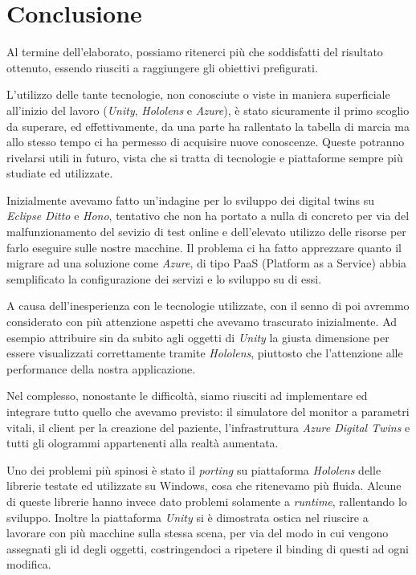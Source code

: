 \chapter{Conclusione}

Al termine dell'elaborato, possiamo ritenerci più che soddisfatti del risultato ottenuto, essendo riusciti a raggiungere gli obiettivi prefigurati.\newline

L'utilizzo delle tante tecnologie, non conosciute o viste in maniera superficiale all'inizio del lavoro (\textit{Unity}, \textit{Hololens} e \textit{Azure}), è stato sicuramente il primo scoglio da superare, ed effettivamente, da una parte ha rallentato la tabella di marcia ma allo stesso tempo ci ha permesso di acquisire nuove conoscenze. Queste potranno rivelarsi utili in futuro, vista che si tratta di tecnologie e piattaforme sempre più studiate ed utilizzate.\newline

Inizialmente avevamo fatto un'indagine per lo sviluppo dei digital twins su \textit{Eclipse Ditto} e \textit{Hono}, tentativo che non ha portato a nulla di concreto per via del malfunzionamento del sevizio di test online e dell'elevato utilizzo delle risorse per farlo eseguire sulle nostre macchine. Il problema ci ha fatto apprezzare quanto il migrare ad una soluzione come \textit{Azure}, di tipo PaaS (Platform as a Service) abbia semplificato la configurazione dei servizi e lo sviluppo su di essi.
\newline

A causa dell'inesperienza con le tecnologie utilizzate, con il senno di poi avremmo considerato con più attenzione aspetti che avevamo trascurato inizialmente. Ad esempio attribuire sin da subito agli oggetti di \textit{Unity} la giusta dimensione per essere visualizzati correttamente tramite \textit{Hololens}, piuttosto che l'attenzione alle performance della nostra applicazione.\newline

Nel complesso, nonostante le difficoltà, siamo riusciti ad implementare ed integrare tutto quello che avevamo previsto: il simulatore del monitor a parametri vitali, il client per la creazione del paziente, l'infrastruttura \textit{Azure Digital Twins} e tutti gli ologrammi appartenenti alla realtà aumentata. \newline

Uno dei problemi più spinosi è stato il \textit{porting} su piattaforma \textit{Hololens} delle librerie testate ed utilizzate su Windows, cosa che ritenevamo più fluida. Alcune di queste librerie hanno invece dato problemi solamente a \textit{runtime}, rallentando lo sviluppo. 
Inoltre la piattaforma \textit{Unity} si è dimostrata ostica nel riuscire a lavorare con più macchine sulla stessa scena, per via del modo in cui vengono assegnati gli id degli oggetti, costringendoci a ripetere il binding di questi ad ogni modifica. \newline


